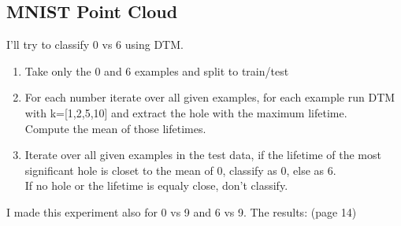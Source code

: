\documentclass[11pt]{article}
\theoremstyle{definition}
\theoremstyle{definition}
\begin{document}
\subsection{MNIST Point Cloud}
I'll try to classify 0 vs 6 using DTM.
\begin{enumerate}
	\item
		Take only the 0 and 6 examples and split to train/test
	\item
		For each number iterate over all given examples, for each example run DTM with k=[1,2,5,10] and extract the hole with the maximum lifetime.\\
		Compute the mean of those lifetimes.
	\item
		Iterate over all given examples in the test data, if the lifetime of the most significant hole is closet to the mean of 0, classify as 0, else as 6.\\
		If no hole or the lifetime is equaly close, don't classify.
\end{enumerate}
I made this experiment also for 0 vs 9 and 6 vs 9.
The results: (page 14)
\end{document}
